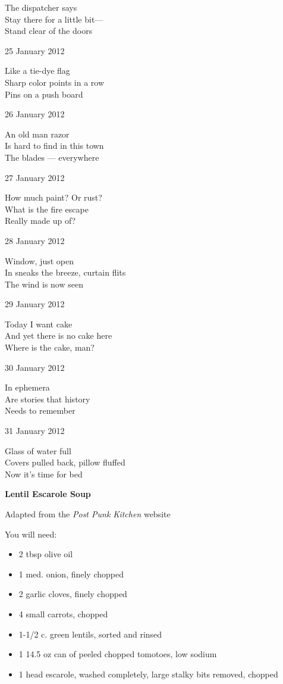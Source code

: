 \documentclass[12pt]{article}
\begin{document}
The dispatcher says \\
Stay there for a little bit--- \\
Stand clear of the doors

\newpage

25 January 2012

Like a tie-dye flag \\
Sharp color points in a row \\
Pins on a push board

26 January 2012

An old man razor \\
Is hard to find in this town \\
The blades --- everywhere

27 January 2012

How much paint? Or rust? \\
What is the fire escape \\
Really made up of?

28 January 2012

Window, just open \\
In sneaks the breeze, curtain flits \\
The wind is now seen

29 January 2012

Today I want cake \\
And yet there is no cake here \\
Where is the cake, man?

30 January 2012

In ephemera \\
Are stories that history \\
Needs to remember

31 January 2012

Glass of water full \\
Covers pulled back, pillow fluffed \\
Now it's time for bed


\newpage
\begin{center}{\bfseries Lentil Escarole Soup}\end{center}
Adapted from the {\em Post Punk Kitchen} website

You will need:

\begin{itemize}
    \item 2 tbsp olive oil
    \item 1 med. onion, finely chopped
    \item 2 garlic cloves, finely chopped
    \item 4 small carrots, chopped
    \item 1-1/2 c. green lentils, sorted and rinsed
    \item 1 14.5 oz can of peeled chopped tomotoes, low sodium
    \item 1 head escarole, washed completely, large stalky bits removed, chopped
\end{itemize}
\end{document}
